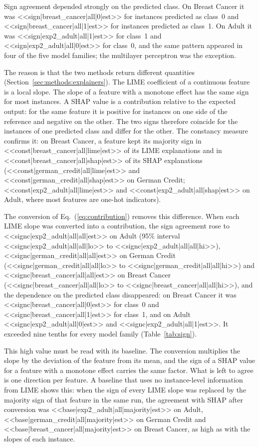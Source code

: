 \documentclass{cys}
\begin{document}
Sign agreement depended strongly on the predicted class. On Breast Cancer it was
<<sign|breast_cancer|all|0|est>> for instances predicted as class~0 and
<<sign|breast_cancer|all|1|est>> for instances predicted as class~1. On Adult it was
<<sign|exp2_adult|all|1|est>> for class~1 and <<sign|exp2_adult|all|0|est>> for
class~0, and the same pattern appeared in four of the five model families; the
multilayer perceptron was the exception.

The reason is that the two methods return different quantities
(Section~\ref{sec:methods:explainers}). The LIME coefficient of a continuous feature is a
local slope. The slope of a feature with a monotone effect has the same sign for most
instances. A SHAP value is a contribution relative to the expected output: for the same
feature it is positive for instances on one side of the reference and negative on the
other. The two signs therefore coincide for the instances of one predicted class and
differ for the other. The constancy measure confirms it: on Breast Cancer, a feature
kept its majority sign in <<const|breast_cancer|all|lime|est>> of its LIME explanations
and in <<const|breast_cancer|all|shap|est>> of its SHAP explanations
(<<const|german_credit|all|lime|est>> and <<const|german_credit|all|shap|est>> on German
Credit; <<const|exp2_adult|all|lime|est>> and <<const|exp2_adult|all|shap|est>> on
Adult, where most features are one-hot indicators).

The conversion of Eq.~(\ref{eq:contribution}) removes this difference. When each LIME
slope was converted into a contribution, the sign agreement rose to
<<signc|exp2_adult|all|all|est>> on Adult (95\% interval
<<signc|exp2_adult|all|all|lo>> to <<signc|exp2_adult|all|all|hi>>),
<<signc|german_credit|all|all|est>> on German Credit
(<<signc|german_credit|all|all|lo>> to <<signc|german_credit|all|all|hi>>) and
<<signc|breast_cancer|all|all|est>> on Breast Cancer
(<<signc|breast_cancer|all|all|lo>> to <<signc|breast_cancer|all|all|hi>>), and the
dependence on the predicted class disappeared: on Breast Cancer it was
<<signc|breast_cancer|all|0|est>> for class~0 and <<signc|breast_cancer|all|1|est>> for
class~1, and on Adult <<signc|exp2_adult|all|0|est>> and
<<signc|exp2_adult|all|1|est>>. It exceeded nine tenths for every model family
(Table~\ref{tab:sign}).

This high value must be read with its baseline. The conversion multiplies the slope by
the deviation of the feature from its mean, and the sign of a SHAP value for a feature
with a monotone effect carries the same factor. What is left to agree is one direction
per feature. A baseline that uses no instance-level information from LIME shows this:
when the sign of every LIME slope was replaced by the majority sign of that feature in
the same run, the agreement with SHAP after conversion was
<<base|exp2_adult|all|majority|est>> on Adult, <<base|german_credit|all|majority|est>> on
German Credit and <<base|breast_cancer|all|majority|est>> on Breast Cancer, as high as with
the slopes of each instance.
\end{document}
